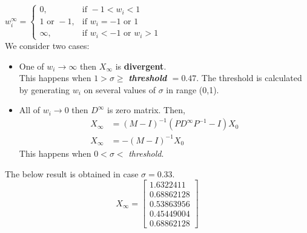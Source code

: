 \documentclass[11pt]{article}
\begin{document}
$w_i^{\infty} = \begin{cases}  0, &\mbox{if }  -1 < w_i < 1\\ 1 \mbox{ or } -1, & \mbox{if } w_i = -1  \mbox{ or } 1
\\ \infty, &\mbox{if } w_i < -1 \mbox{ or } w_i > 1
 \end{cases}$\\   
We consider two cases:
\begin{itemize}
\item One of $w_i \rightarrow \infty$ then $X_{\infty}$ is \textbf{divergent}. \\This happens when $1 > \sigma \geq$ \textbf{\textit{threshold}  $=0.47$}. The threshold is calculated by generating $w_i$ on several values of $\sigma$ in range (0,1).
\item All of $w_i \rightarrow 0$ then $D^{\infty}$ is zero matrix. Then, 
\begin{equation*} 
\begin{split}
X_{\infty} &= (M-I)^{-1}(PD^{\infty}P^{-1} - I)X_0 \\
X_{\infty} &= -(M-I)^{-1}X_0
\end{split}
\end{equation*}
This happens when $0 < \sigma <$ \textit{threshold}.

\end{itemize}
The below result is obtained in case $\sigma = 0.33$.\\
\[X_{\infty} = 
\begin{bmatrix}
1.6322411 \\
0.68862128\\
0.53863956\\
0.45449004\\
0.68862128
\end{bmatrix}
\]
\end{document}
